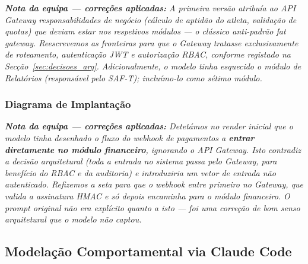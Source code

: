\noindent\textit{\textbf{Nota da equipa --- correções aplicadas:} A primeira versão atribuía ao API Gateway responsabilidades de negócio (cálculo de aptidão do atleta, validação de quotas) que deviam estar nos respetivos módulos --- o clássico anti-padrão \textit{fat gateway}. Reescrevemos as fronteiras para que o Gateway tratasse exclusivamente de roteamento, autenticação JWT e autorização RBAC, conforme registado na Secção~\ref{sec:decisoes_arq}. Adicionalmente, o modelo tinha esquecido o módulo de Relatórios (responsável pelo SAF-T); incluímo-lo como sétimo módulo.}

\subsubsection*{Diagrama de Implantação}


\noindent\textit{\textbf{Nota da equipa --- correções aplicadas:} Detetámos no \textit{render} inicial que o modelo tinha desenhado o fluxo do \textit{webhook} de pagamentos a \textbf{entrar diretamente no módulo financeiro}, ignorando o API Gateway. Isto contradiz a decisão arquitetural (toda a entrada no sistema passa pelo Gateway, para benefício do RBAC e da auditoria) e introduziria um vetor de entrada não autenticado. Refizemos a seta para que o \textit{webhook} entre primeiro no Gateway, que valida a assinatura HMAC e só depois encaminha para o módulo financeiro. O \textit{prompt} original não era explícito quanto a isto --- foi uma correção de bom senso arquitetural que o modelo não captou.}

\subsection{Modelação Comportamental via Claude Code}\label{subsec:ia_arq_comportamento}

